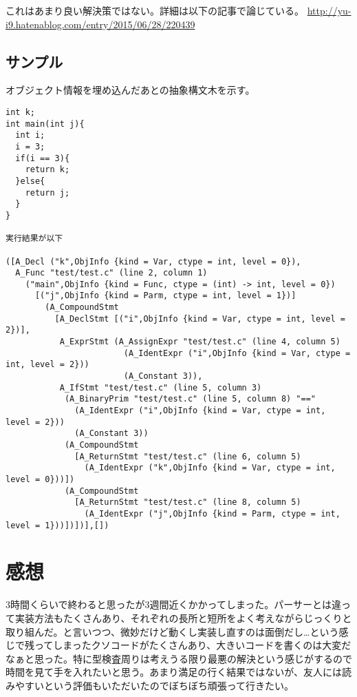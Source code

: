\documentclass{jsarticle}
\begin{document}
これはあまり良い解決策ではない。詳細は以下の記事で論じている。
\url{http://yu-i9.hatenablog.com/entry/2015/06/28/220439}

\subsection{サンプル}
オブジェクト情報を埋め込んだあとの抽象構文木を示す。
\begin{verbatim}
int k;
int main(int j){
  int i;
  i = 3;
  if(i == 3){
    return k;
  }else{
    return j;
  }
}

実行結果が以下

([A_Decl ("k",ObjInfo {kind = Var, ctype = int, level = 0}),
  A_Func "test/test.c" (line 2, column 1)
    ("main",ObjInfo {kind = Func, ctype = (int) -> int, level = 0})
      [("j",ObjInfo {kind = Parm, ctype = int, level = 1})]
        (A_CompoundStmt
          [A_DeclStmt [("i",ObjInfo {kind = Var, ctype = int, level = 2})],
           A_ExprStmt (A_AssignExpr "test/test.c" (line 4, column 5)
                        (A_IdentExpr ("i",ObjInfo {kind = Var, ctype = int, level = 2}))
                        (A_Constant 3)),
           A_IfStmt "test/test.c" (line 5, column 3)
            (A_BinaryPrim "test/test.c" (line 5, column 8) "=="
              (A_IdentExpr ("i",ObjInfo {kind = Var, ctype = int, level = 2}))
              (A_Constant 3))
            (A_CompoundStmt
              [A_ReturnStmt "test/test.c" (line 6, column 5)
                (A_IdentExpr ("k",ObjInfo {kind = Var, ctype = int, level = 0}))])
            (A_CompoundStmt
              [A_ReturnStmt "test/test.c" (line 8, column 5)
                (A_IdentExpr ("j",ObjInfo {kind = Parm, ctype = int, level = 1}))])])],[])
\end{verbatim}

\section{感想}
3時間くらいで終わると思ったが3週間近くかかってしまった。パーサーとは違って実装方法もたくさんあり、それぞれの長所と短所をよく考えながらじっくりと取り組んだ。と言いつつ、微妙だけど動くし実装し直すのは面倒だし…という感じで残ってしまったクソコードがたくさんあり、大きいコードを書くのは大変だなぁと思った。特に型検査周りは考えうる限り最悪の解決という感じがするので時間を見て手を入れたいと思う。あまり満足の行く結果ではないが、友人には読みやすいという評価もいただいたのでぼちぼち頑張って行きたい。
\end{document}
